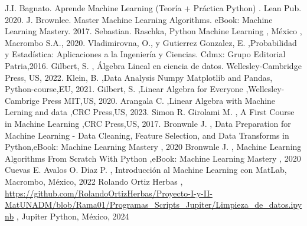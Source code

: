 \documentclass[12pt,spanish,oneside,letterpaper]{book}
\begin{document}
\begin{thebibliography}{99}
   J.I. Bagnato. Aprende Machine Learning (Teoría + Práctica Python) . Lean Pub. 2020.
   J. Brownlee. Master Machine Learning Algorithms. eBook: Machine Learning Mastery. 2017.
   Sebastian. Raschka, Python Machine Learning , México , Macrombo S.A., 2020.
   Vladimirovna, O., y Gutierrez Gonzalez, E. ,Probabilidad y Estadística: Aplicaciones a la Ingeniería y Ciencias. Cdmx: Grupo Editorial Patria,2016.
   Gilbert, S. , Álgebra Lineal en ciencia de datos. Wellesley-Cambridge Press, US, 2022.
   Klein, B. ,Data Analysis Numpy Matplotlib and Pandas, Python-course,EU, 2021.
   Gilbert, S. ,Linear Algebra for Everyone ,Wellesley-Cambrige Press MIT,US, 2020.
   Arangala C. ,Linear Algebra with Machine Lerning and data ,CRC Press,US, 2023.
   Simon R. Girolami M. , A First Course in Machine Learning ,CRC Press,US, 2017.
   Bronwnle J. , Data Preparation for Machine Learning - Data Cleaning, Feature Selection, and Data Transforms in Python,eBook: Machine Learning Mastery , 2020
   Bronwnle J. , Machine Learning Algorithms From Scratch With Python ,eBook: Machine Learning Mastery , 2020
   Cuevas E. Avalos O. Diaz P. , Introducción al Machine Learning con MatLab, Macrombo, México, 2022
   Rolando Ortiz Herbas , \url{https://github.com/RolandoOrtizHerbas/Proyecto-I-y-II-MatUNADM/blob/Rama01/Programas_Scripts_Jupiter/Limpieza_de_datos.ipynb} , Jupiter Python, México, 2024
\end{thebibliography}
\end{document}
